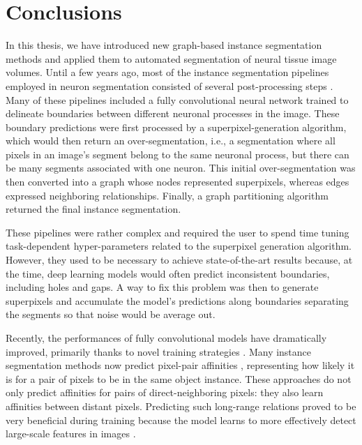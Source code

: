 

\chapter*{Conclusions}
In this thesis, we have introduced new graph-based instance segmentation methods and applied them to automated segmentation of neural tissue image volumes. 
Until a few years ago, most of the instance segmentation pipelines employed in neuron segmentation consisted of several post-processing steps \cite{lee2017superhuman,funke2018large,beier2017multicut,funke2018candidate,pape2017solving,meirovitch2016multi,liu2016sshmt}. Many of these pipelines included a fully convolutional neural network trained to delineate boundaries between different neuronal processes in the image. These boundary predictions were first processed by a superpixel-generation algorithm, which would then return an over-segmentation, i.e., a segmentation where all pixels in an image's segment belong to the same neuronal process, but there can be many segments associated with one neuron. This initial over-segmentation was then converted into a graph whose nodes represented superpixels, whereas edges expressed neighboring relationships. Finally, a graph partitioning algorithm returned the final instance segmentation. 

These pipelines were rather complex and required the user to spend time tuning task-dependent hyper-parameters related to the superpixel generation algorithm. However, they used to be necessary to achieve state-of-the-art results because, at the time, deep learning models would often predict inconsistent boundaries, including holes and gaps. A way to fix this problem was then to generate superpixels and accumulate the model's predictions along boundaries separating the segments so that noise would be average out. 

Recently, the performances of fully convolutional models have dramatically improved, primarily thanks to novel training strategies \cite{lee2017superhuman,milletari2016v}. Many instance segmentation methods now predict pixel-pair affinities \cite{Gao_2019_ICCV,liu2018affinity,lee2017superhuman}, representing how likely it is for a pair of pixels to be in the same object instance. These approaches do not only predict affinities for pairs of direct-neighboring pixels: they also learn affinities between distant pixels. Predicting such long-range relations proved to be very beneficial during training because the model learns to more effectively detect large-scale features in images \cite{lee2017superhuman}. 

